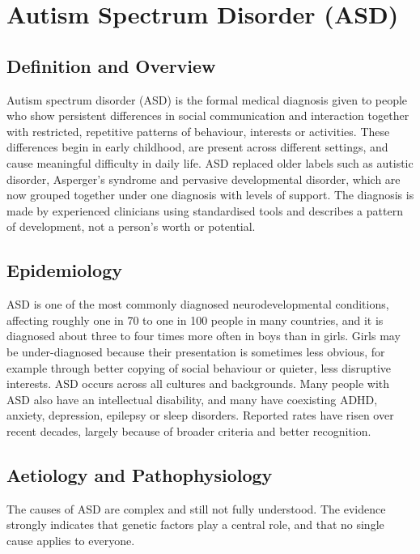 \chapter{Autism Spectrum Disorder (ASD)}

\section*{Definition and Overview}
Autism spectrum disorder (ASD) is the formal medical diagnosis given to people who show persistent differences in social communication and interaction together with restricted, repetitive patterns of behaviour, interests or activities. These differences begin in early childhood, are present across different settings, and cause meaningful difficulty in daily life. ASD replaced older labels such as autistic disorder, Asperger's syndrome and pervasive developmental disorder, which are now grouped together under one diagnosis with levels of support. The diagnosis is made by experienced clinicians using standardised tools and describes a pattern of development, not a person's worth or potential.

\section*{Epidemiology}
ASD is one of the most commonly diagnosed neurodevelopmental conditions, affecting roughly one in 70 to one in 100 people in many countries, and it is diagnosed about three to four times more often in boys than in girls. Girls may be under-diagnosed because their presentation is sometimes less obvious, for example through better copying of social behaviour or quieter, less disruptive interests. ASD occurs across all cultures and backgrounds. Many people with ASD also have an intellectual disability, and many have coexisting ADHD, anxiety, depression, epilepsy or sleep disorders. Reported rates have risen over recent decades, largely because of broader criteria and better recognition.

\section*{Aetiology and Pathophysiology}
The causes of ASD are complex and still not fully understood. The evidence strongly indicates that genetic factors play a central role, and that no single cause applies to everyone.

